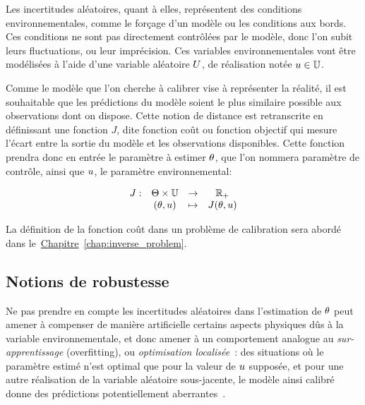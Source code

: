 \documentclass[../../Main_ManuscritThese.tex]{subfiles}
\newcommand{\frchap}[1]{\hyperref[#1]{Chapitre}~\ref{#1}}
\begin{document}
Les incertitudes aléatoires, quant à elles, représentent des
conditions environnementales, comme le forçage d'un modèle ou les
conditions aux bords. Ces conditions ne sont pas directement
contrôlées par le modèle, donc l'on subit leurs fluctuations, ou leur
imprécision.  Ces variables environnementales vont être modélisées à
l'aide d'une variable aléatoire $U$, de réalisation notée
$u\in \mathbb{U}$.

Comme le modèle que l'on cherche à calibrer vise à représenter la
réalité, il est souhaitable que les prédictions du modèle soient le
plus similaire possible aux observations dont on dispose. Cette notion
de distance est retranscrite en définissant une fonction $J$, dite
fonction coût ou fonction objectif qui mesure l'écart entre la sortie
du modèle et les observations disponibles. Cette fonction prendra donc
en entrée le paramètre à estimer $\theta$, que l'on nommera paramètre de
contrôle, ainsi que $u$, le paramètre environnemental:

\begin{equation*}
  \label{eq:def_J}
  \begin{array}{rccc}
   J: & \Theta\times\mathbb{U}& \rightarrow& \mathbb{R}_+ \\
   &(\theta,u)& \mapsto& J(\theta,u)
  \end{array}
\end{equation*}

La définition de la fonction coût dans un problème de calibration sera
abordé dans le~\frchap{chap:inverse_problem}.

\subsection*{Notions de robustesse}

Ne pas prendre en compte les incertitudes aléatoires dans l'estimation
de $\theta$ peut amener à compenser de manière artificielle certains
aspects physiques dûs à la variable environnementale, et donc amener à
un comportement analogue au \emph{sur-apprentissage} (overfitting), ou
\emph{optimisation localisée}~\cite{huyse_probabilistic_2002}: des
situations où le paramètre estimé n'est optimal que pour la valeur de
$u$ supposée, et pour une autre réalisation de la variable aléatoire
sous-jacente, le modèle ainsi calibré donne des prédictions
potentiellement aberrantes~\cite{kuczera_there_2010}.
\end{document}
